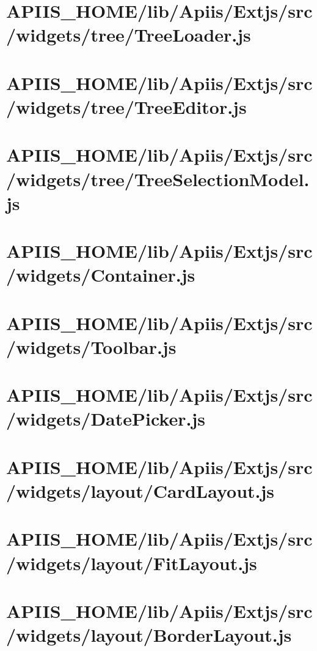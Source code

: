 \section{APIIS\_HOME/lib/Apiis/Extjs/src/widgets/tree/TreeLoader.js} 
\section{APIIS\_HOME/lib/Apiis/Extjs/src/widgets/tree/TreeEditor.js} 
\section{APIIS\_HOME/lib/Apiis/Extjs/src/widgets/tree/TreeSelectionModel.js} 
\section{APIIS\_HOME/lib/Apiis/Extjs/src/widgets/Container.js} 
\section{APIIS\_HOME/lib/Apiis/Extjs/src/widgets/Toolbar.js} 
\section{APIIS\_HOME/lib/Apiis/Extjs/src/widgets/DatePicker.js} 
\section{APIIS\_HOME/lib/Apiis/Extjs/src/widgets/layout/CardLayout.js} 
\section{APIIS\_HOME/lib/Apiis/Extjs/src/widgets/layout/FitLayout.js} 
\section{APIIS\_HOME/lib/Apiis/Extjs/src/widgets/layout/BorderLayout.js} 
